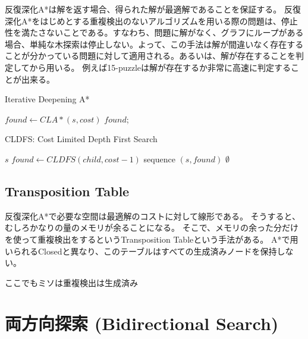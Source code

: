 \documentclass[b5paper]{report}
\begin{document}
反復深化A*は解を返す場合、得られた解が最適解であることを保証する。
反復深化A*をはじめとする重複検出のないアルゴリズムを用いる際の問題は、停止性を満たさないことである。すなわち、問題に解がなく、グラフにループがある場合、単純な木探索は停止しない。よって、この手法は解が間違いなく存在することが分かっている問題に対して適用される。あるいは、解が存在することを判定してから用いる。
例えば15-puzzleは解が存在するか非常に高速に判定することが出来る。



\begin{algorithm}
\caption{Iterative Deepening A*}
\label{alg:iterative-deepening-astar}
	 {
		$found \leftarrow CLA*(s, cost)$\;
		 {
			\Return $found$;
		}
	}
\end{algorithm}

\begin{algorithm}
\caption{CLDFS: Cost Limited Depth First Search}
\label{alg:cldfs}
	 {
		\Return $s$\;
	}
	 {
		$found \leftarrow CLDFS(child, cost - 1)$\;
		 {
			\Return sequence $(s, found)$\;
		}
	}
	\Return $\emptyset$\;
\end{algorithm}

\subsection{Transposition Table}

反復深化A*で必要な空間は最適解のコストに対して線形である。
そうすると、むしろかなりの量のメモリが余ることになる。
そこで、メモリの余った分だけを使って重複検出をするというTransposition Tableという手法がある。
A*で用いられるClosedと異なり、このテーブルはすべての生成済みノードを保持しない。

ここでもミソは重複検出は生成済み

\section{両方向探索 (Bidirectional Search)}
\label{sec:bidirectional-search}
\end{document}
